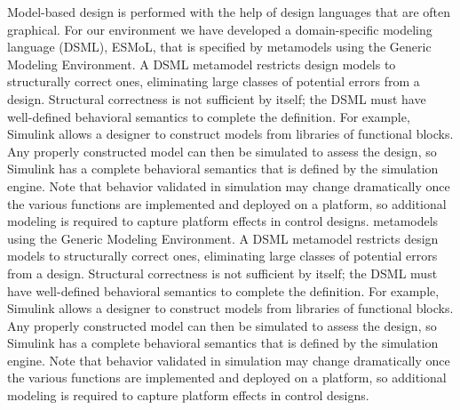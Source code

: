 Model-based design is performed with the help of design languages that are often graphical. For our environment we have developed a domain-specific modeling language (DSML), ESMoL, that is specified by metamodels using the Generic Modeling Environment\cite{karsai:mic}.  A DSML metamodel restricts design models to structurally correct ones, eliminating large classes of potential errors from a design.  Structural correctness is not sufficient by itself; the DSML must have well-defined behavioral semantics to complete the definition.  For example, Simulink allows a designer to construct models from libraries of functional blocks.  Any properly constructed model can then be simulated to assess the design, so Simulink has a complete behavioral semantics that is defined by the simulation engine.  Note that behavior validated in simulation may change dramatically once the various functions are implemented and deployed on a platform, so additional modeling is required to capture platform effects in control designs. metamodels using the Generic Modeling Environment\cite{karsai:mic}.  A DSML metamodel restricts design models to structurally correct ones, eliminating large classes of potential errors from a design.  Structural correctness is not sufficient by itself; the DSML must have well-defined behavioral semantics to complete the definition.  For example, Simulink allows a designer to construct models from libraries of functional blocks.  Any properly constructed model can then be simulated to assess the design, so Simulink has a complete behavioral semantics that is defined by the simulation engine.  Note that behavior validated in simulation may change dramatically once the various functions are implemented and deployed on a platform, so additional modeling is required to capture platform effects in control designs.

